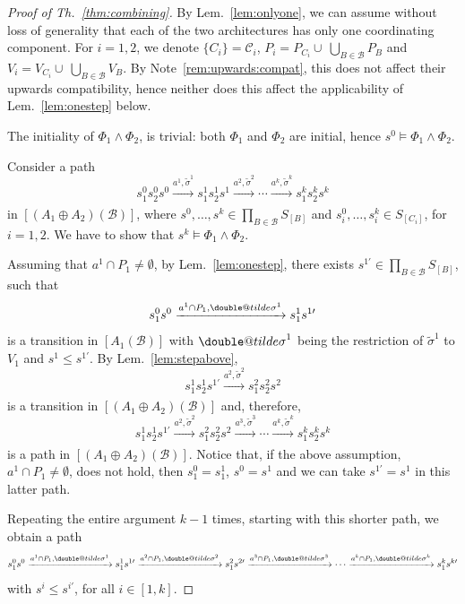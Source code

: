 \documentclass{llncs}
\makeatletter
\newcommand{\rem}[1]{Note~\ref{rem:#1}}
\newcommand{\lem}[1]{Lem.~\ref{lem:#1}}
\newcommand{\thm}[1]{Th.~\ref{thm:#1}}
\newcommand{\cB}{\ensuremath{\mathcal{B}}}
\newcommand{\cC}{\ensuremath{\mathcal{C}}}
\newcommand{\goesto}[2][]{\ensuremath{\xrightarrow[#1]{#2}}}
\newcommand{\val}[3][]{\ensuremath{#1{\sigma}^{#2}_{#3}}}
\newcommand{\semopen}[1]{\ensuremath{[{#1}]}}
\newcommand{\arcomp}{\oplus}
\newcommand{\order}{\leqslant}
\newcommand{\doubletilde}[1]{{%
  \mathpalette\double@tilde{#1}%
}}
\newcommand{\double@tilde}[2]{%
  \sbox\z@{$\m@th#1\tilde{#2}$}%
  \ht\z@=.9\ht\z@
  \tilde{\box\z@}%
}
\makeatother
\begin{document}
\begin{proof}[Proof of \thm{combining}]
  By \lem{onlyone}, we can assume without loss of generality that each of the two
  architectures has only one coordinating component.  For $i =
  1,2$, we denote $\{C_i\} = \cC_i$, $P_i = P_{C_i}
  \cup\ \bigcup_{B \in \cB} P_B$ and $V_i = V_{C_i}
  \cup\ \bigcup_{B \in \cB} V_B$.
%
  By \rem{upwards:compat}, this does not affect their upwards
  compatibility, hence neither does this affect the applicability of
  \lem{onestep} below.
  
  The initiality of $\Phi_1 \land \Phi_2$, is trivial: both
  $\Phi_1$ and $\Phi_2$ are initial, hence $s^0 \models \Phi_1
  \land \Phi_2$.

  Consider a path
%
  \[
  s^0_1 s^0_2 s^0
%
  \goesto{a^1, \val[\tilde]{1}{}}
%
  s^1_1 s^1_2 s^1
%
  \goesto{a^2, \val[\tilde]{2}{}}
  \cdots
  \goesto{a^k, \val[\tilde]{k}{}}
%
  s^k_1 s^k_2 s^k
  \]
%
  in $\semopen{(A_1 \arcomp A_2)(\cB)}$, where
  $s^0,\dots,s^k \in \prod_{B \in \cB} S_{\semopen{B}}$ and
  $s^0_i,\dots, s^k_i \in S_{\semopen{C_i}}$, for $i=1,2$.
  We have to show that $s^k \models \Phi_1 \land \Phi_2$.

  Assuming that $a^1 \cap P_1 \neq \emptyset$, by \lem{onestep},
  there exists $s^{1\prime} \in \prod_{B \in \cB} S_{\semopen{B}}$,
  such that
%
  \[
  s^0_1 s^0
%
  \goesto{a^1 \cap P_1, \val[\doubletilde]{1}{}}
%
  s^1_1 s^{1\prime}
  \]
%
  is a transition in $\semopen{A_1(\cB)}$ with
  $\val[\doubletilde]{1}{}$ being the restriction of
  $\val[\tilde]{1}{}$ to $V_1$ and
  $s^1 \order s^{1\prime}$.
%
  By \lem{stepabove}, 
  \[
  s^1_1 s^1_2 s^{1\prime}
%
  \goesto{a^2, \val[\tilde]{2}{}}
%
  s^2_1 s^2_2 s^2
  \]
  is a transition in $\semopen{(A_1 \arcomp A_2)(\cB)}$ and,
  therefore, 
  \[
  s^1_1 s^1_2 s^{1\prime}
%
  \goesto{a^2, \val[\tilde]{2}{}}
%
  s^2_1 s^2_2 s^2
%
  \goesto{a^3, \val[\tilde]{3}{}}
  \cdots
  \goesto{a^k, \val[\tilde]{k}{}}
%
  s^k_1 s^k_2 s^k
  \]
%  
  is a path in $\semopen{(A_1 \arcomp A_2)(\cB)}$.
%
  Notice that, if the above assumption, $a^1 \cap P_1 \neq
  \emptyset$, does not hold, then $s^0_1 = s^1_1$, $s^0 = s^1$
  and we can take $s^{1\prime} = s^1$ in this latter path.

  Repeating the entire argument $k-1$ times, starting with this
  shorter path, we obtain a path
%
  \begin{equation}
    \label{eq:path-in-1}
    s^0_1 s^0
    \goesto{a^1 \cap P_1, \val[\doubletilde]{1}{}}
    s^1_1 s^{1\prime}
    \goesto{a^2 \cap P_1, \val[\doubletilde]{2}{}}
    s^2_1 s^{2\prime}
    \goesto{a^3 \cap P_1, \val[\doubletilde]{3}{}}
    \cdots
    \goesto{a^k \cap P_1, \val[\doubletilde]{k}{}}
    s^k_1 s^{k\prime}
  \end{equation}
%  
  with $s^i \order s^{i\prime}$, for all $i \in [1,k]$.


\end{proof}
\end{document}
